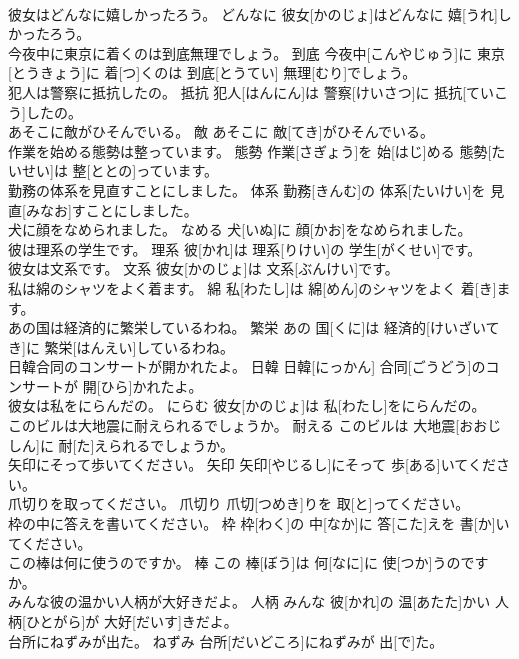 \documentclass[8pt]{extreport}
\begin{document}
\begin{CJK}{UTF8}{min}
\\	彼女はどんなに嬉しかったろう。	どんなに	彼女[かのじょ]はどんなに 嬉[うれ]しかったろう。	
\\	今夜中に東京に着くのは到底無理でしょう。	到底	今夜中[こんやじゅう]に 東京[とうきょう]に 着[つ]くのは 到底[とうてい] 無理[むり]でしょう。	
\\	犯人は警察に抵抗したの。	抵抗	犯人[はんにん]は 警察[けいさつ]に 抵抗[ていこう]したの。	
\\	あそこに敵がひそんでいる。	敵	あそこに 敵[てき]がひそんでいる。	
\\	作業を始める態勢は整っています。	態勢	作業[さぎょう]を 始[はじ]める 態勢[たいせい]は 整[ととの]っています。	
\\	勤務の体系を見直すことにしました。	体系	勤務[きんむ]の 体系[たいけい]を 見直[みなお]すことにしました。	
\\	犬に顔をなめられました。	なめる	犬[いぬ]に 顔[かお]をなめられました。	
\\	彼は理系の学生です。	理系	彼[かれ]は 理系[りけい]の 学生[がくせい]です。	
\\	彼女は文系です。	文系	彼女[かのじょ]は 文系[ぶんけい]です。	
\\	私は綿のシャツをよく着ます。	綿	私[わたし]は 綿[めん]のシャツをよく 着[き]ます。	
\\	あの国は経済的に繁栄しているわね。	繁栄	あの 国[くに]は 経済的[けいざいてき]に 繁栄[はんえい]しているわね。	
\\	日韓合同のコンサートが開かれたよ。	日韓	日韓[にっかん] 合同[ごうどう]のコンサートが 開[ひら]かれたよ。	
\\	彼女は私をにらんだの。	にらむ	彼女[かのじょ]は 私[わたし]をにらんだの。	
\\	このビルは大地震に耐えられるでしょうか。	耐える	このビルは 大地震[おおじしん]に 耐[た]えられるでしょうか。	
\\	矢印にそって歩いてください。	矢印	矢印[やじるし]にそって 歩[ある]いてください。	
\\	爪切りを取ってください。	爪切り	爪切[つめき]りを 取[と]ってください。	
\\	枠の中に答えを書いてください。	枠	枠[わく]の 中[なか]に 答[こた]えを 書[か]いてください。	
\\	この棒は何に使うのですか。	棒	この 棒[ぼう]は 何[なに]に 使[つか]うのですか。	
\\	みんな彼の温かい人柄が大好きだよ。	人柄	みんな 彼[かれ]の 温[あたた]かい 人柄[ひとがら]が 大好[だいす]きだよ。	
\\	台所にねずみが出た。	ねずみ	台所[だいどころ]にねずみが 出[で]た。	

\end{CJK}
\end{document}
